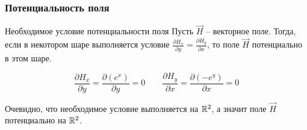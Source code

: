 \begin{frame}\frametitle{Потенциальность поля}
	\begin{block}{Необходимое условие потенциальности поля}
		Пусть \(\vec H\) -- векторное поле.
		Тогда, если в некотором шаре выполняется условие
		\(\frac{\partial H_x}{\partial y} = \frac{\partial H_y}{\partial x}\),
		то поле \(\vec H\) потенциально в этом шаре\cite[ст.~270,272]{zorich}.
	\end{block}

	\[
		\frac{\partial H_x}{\partial y} = \frac{\partial (e^x)}{\partial y} = 0
		\qquad
		\frac{\partial H_y}{\partial x} = \frac{\partial (-e^y)}{\partial x} = 0
	\]

	Очевидно, что необходимое условие выполняется на \(\mathbb{R}^2\), а значит
	поле \(\vec H\) потенциально на \(\mathbb{R}^2\).

\end{frame}
